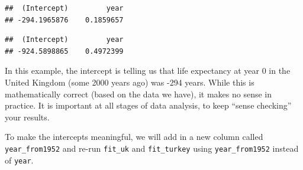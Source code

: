 \documentclass[12pt,]{krantz}
\makeatletter
\newenvironment{Shaded}{\begin{snugshade}}{\end{snugshade}}
\newcommand{\DataTypeTok}[1]{\textcolor[rgb]{0.13,0.29,0.53}{#1}}
\newcommand{\DecValTok}[1]{\textcolor[rgb]{0.00,0.00,0.81}{#1}}
\newcommand{\KeywordTok}[1]{\textcolor[rgb]{0.13,0.29,0.53}{\textbf{#1}}}
\newcommand{\NormalTok}[1]{#1}
\newcommand{\OperatorTok}[1]{\textcolor[rgb]{0.81,0.36,0.00}{\textbf{#1}}}
\newcommand{\StringTok}[1]{\textcolor[rgb]{0.31,0.60,0.02}{#1}}
\newenvironment{kframe}{%
\medskip{}
\setlength{\fboxsep}{.8em}
 \def\at@end@of@kframe{}%
 \ifinner\ifhmode%
  \def\at@end@of@kframe{\end{minipage}}%
  \begin{minipage}{\columnwidth}%
 \fi\fi%
 \def\FrameCommand##1{\hskip\@totalleftmargin \hskip-\fboxsep
 \colorbox{shadecolor}{##1}\hskip-\fboxsep
     \hskip-\linewidth \hskip-\@totalleftmargin \hskip\columnwidth}%
 \MakeFramed {\advance\hsize-\width
   \@totalleftmargin\z@ \linewidth\hsize
   \@setminipage}}%
 {\par\unskip\endMakeFramed%
 \at@end@of@kframe}
\renewenvironment{Shaded}{\begin{kframe}}{\end{kframe}}
\theoremstyle{definition}
\theoremstyle{definition}
\theoremstyle{definition}
\theoremstyle{remark}
\makeatother
\begin{document}
\begin{Shaded}
\end{Shaded}

\begin{verbatim}
##  (Intercept)         year 
## -294.1965876    0.1859657
\end{verbatim}

\begin{Shaded}
\end{Shaded}

\begin{verbatim}
##  (Intercept)         year 
## -924.5898865    0.4972399
\end{verbatim}

In this example, the intercept is telling us that life expectancy at
year 0 in the United Kingdom (some 2000 years ago) was -294 years. While
this is mathematically correct (based on the data we have), it makes no
sense in practice. It is important at all stages of data analysis, to
keep ``sense checking'' your results.

To make the intercepts meaningful, we will add in a new column called
\texttt{year\_from1952} and re-run \texttt{fit\_uk} and
\texttt{fit\_turkey} using \texttt{year\_from1952} instead of
\texttt{year}.

\begin{Shaded}
\end{Shaded}
\end{document}
